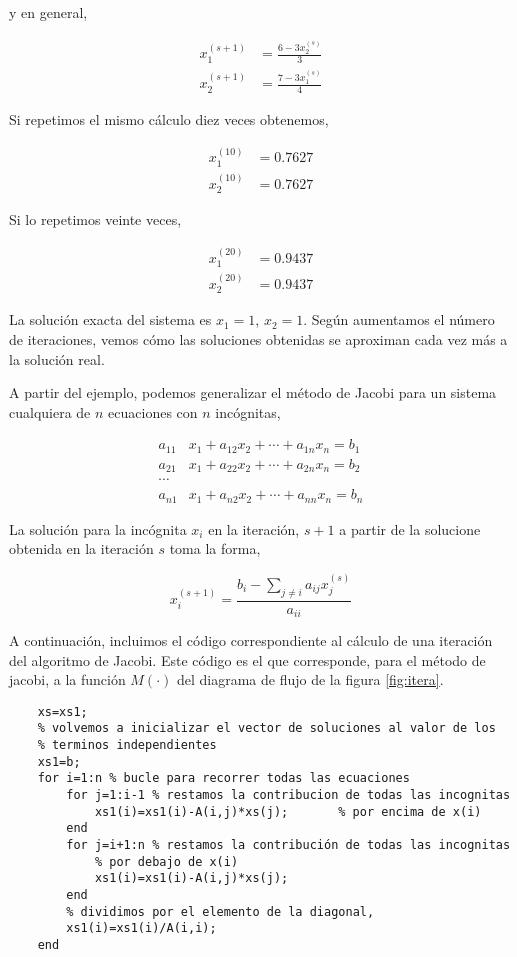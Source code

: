 y en general,

\begin{align*}
x_1^{(s+1)}&=\frac{6-3x_2^{(s)}}{3}\\
x_2^{(s+1)}&=\frac{7-3x_1^{(s)}}{4}
\end{align*}

Si repetimos el mismo cálculo diez veces obtenemos,

\begin{align*}
x_1^{(10)}&=0.7627\\
x_2^{(10)}&=0.7627
\end{align*}

Si lo repetimos veinte veces,

\begin{align*}
x_1^{(20)}&=0.9437\\
x_2^{(20)}&=0.9437
\end{align*}

La solución exacta del sistema es $x_1=1$, $x_2=1$. Según aumentamos el número de iteraciones, vemos cómo las soluciones obtenidas se aproximan cada vez más a la solución real.

A partir del ejemplo, podemos generalizar el método de Jacobi para un sistema cualquiera de $n$ ecuaciones con $n$ incógnitas,

\begin{align*}
a_{11}&x_1+a_{12}x_2+\cdots +a_{1n}x_n=b_1\\
a_{21}&x_1+a_{22}x_2+\cdots +a_{2n}x_n=b_2\\
\cdots & \\
a_{n1}&x_1+a_{n2}x_2+\cdots +a_{nn}x_n=b_n
\end{align*}

La solución para la incógnita $x_i$ en la iteración, $s+1$ a partir de la solucione obtenida en la iteración $s$ toma la forma,

\begin{equation*}
x_i^{(s+1)}=\frac{b_i-\sum_{j\neq i}a_{ij}x_j^{(s)}}{a_{ii}}
\end{equation*}

A continuación, incluimos el código correspondiente al cálculo de una iteración del algoritmo de Jacobi. Este código es el que corresponde, para el método de jacobi, a la función $M(\cdot)$ del diagrama de flujo de la figura \ref{fig:itera}.

\begin{lstlisting}
 	xs=xs1;
    % volvemos a inicializar el vector de soluciones al valor de los
    % terminos independientes
    xs1=b; 
    for i=1:n % bucle para recorrer todas las ecuaciones
        for j=1:i-1 % restamos la contribucion de todas las incognitas
            xs1(i)=xs1(i)-A(i,j)*xs(j);       % por encima de x(i)
        end
        for j=i+1:n % restamos la contribución de todas las incognitas
            % por debajo de x(i)
            xs1(i)=xs1(i)-A(i,j)*xs(j);
        end
        % dividimos por el elemento de la diagonal,
        xs1(i)=xs1(i)/A(i,i);
    end
\end{lstlisting}

